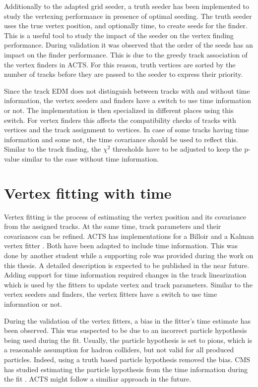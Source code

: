 Additionally to the adapted grid seeder, a truth seeder has been implemented to study the vertexing performance in presence of optimal seeding. The truth seeder uses the true vertex position, and optionally time, to create seeds for the finder. This is a useful tool to study the impact of the seeder on the vertex finding performance. During validation it was observed that the order of the seeds has an impact on the finder performance. This is due to the greedy track association of the vertex finders in ACTS. For this reason, truth vertices are sorted by the number of tracks before they are passed to the seeder to express their priority.

Since the track EDM does not distinguish between tracks with and without time information, the vertex seeders and finders have a switch to use time information or not. The implementation is then specialized in different places using this switch. For vertex finders this affects the compatibility checks of tracks with vertices and the track assignment to vertices. In case of some tracks having time information and some not, the time covariance should be used to reflect this. Similar to the track finding, the $\chi^2$ thresholds have to be adjusted to keep the p-value similar to the case without time information.

\section{Vertex fitting with time}

Vertex fitting is the process of estimating the vertex position and its covariance from the assigned tracks. At the same time, track parameters and their covariances can be refined. ACTS has implementations for a Billoir \cite{billoir} and a Kalman vertex fitter \cite{fruehwirth}. Both have been adapted to include time information. This was done by another student while a supporting role was provided during the work on this thesis. A detailed description is expected to be published in the near future. Adding support for time information required changes in the track linearization which is used by the fitters to update vertex and track parameters. Similar to the vertex seeders and finders, the vertex fitters have a switch to use time information or not.

During the validation of the vertex fitters, a bias in the fitter's time estimate has been observed. This was suspected to be due to an incorrect particle hypothesis being used during the fit. Usually, the particle hypothesis is set to pions, which is a reasonable assumption for hadron colliders, but not valid for all produced particles. Indeed, using a truth based particle hypothesis removed the bias. CMS has studied estimating the particle hypothesis from the time information during the fit \cite{cms-time-vertexing}. ACTS might follow a similiar approach in the future.

